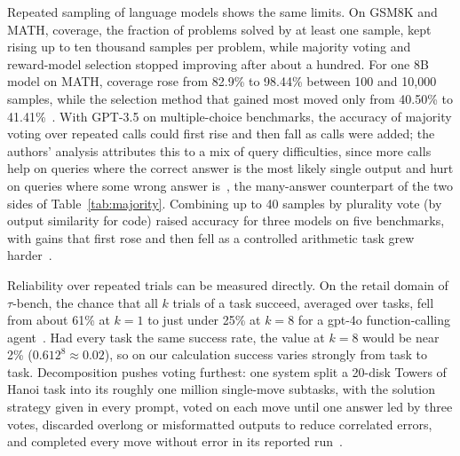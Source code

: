 \documentclass{ieeeaccess}
\begin{document}
Repeated sampling of language models shows the same limits. On GSM8K and MATH, coverage, the fraction of problems solved by at least one sample, kept rising up to ten thousand samples per problem, while majority voting and reward-model selection stopped improving after about a hundred. For one 8B model on MATH, coverage rose from 82.9\% to 98.44\% between 100 and 10{,}000 samples, while the selection method that gained most moved only from 40.50\% to 41.41\%~\cite{brown2024monkeys}. With GPT-3.5 on multiple-choice benchmarks, the accuracy of majority voting over repeated calls could first rise and then fall as calls were added; the authors' analysis attributes this to a mix of query difficulties, since more calls help on queries where the correct answer is the most likely single output and hurt on queries where some wrong answer is~\cite{chen2024more}, the many-answer counterpart of the two sides of Table~\ref{tab:majority}. Combining up to 40 samples by plurality vote (by output similarity for code) raised accuracy for three models on five benchmarks, with gains that first rose and then fell as a controlled arithmetic task grew harder~\cite{li2024more}.

Reliability over repeated trials can be measured directly. On the retail domain of $\tau$-bench, the chance that all $k$ trials of a task succeed, averaged over tasks, fell from about 61\% at $k=1$ to just under 25\% at $k=8$ for a gpt-4o function-calling agent~\cite{yao2025taubench}. Had every task the same success rate, the value at $k=8$ would be near 2\% ($0.612^{8}\approx 0.02$), so on our calculation success varies strongly from task to task. Decomposition pushes voting furthest: one system split a 20-disk Towers of Hanoi task into its roughly one million single-move subtasks, with the solution strategy given in every prompt, voted on each move until one answer led by three votes, discarded overlong or misformatted outputs to reduce correlated errors, and completed every move without error in its reported run~\cite{meyerson2025maker}.
\end{document}
